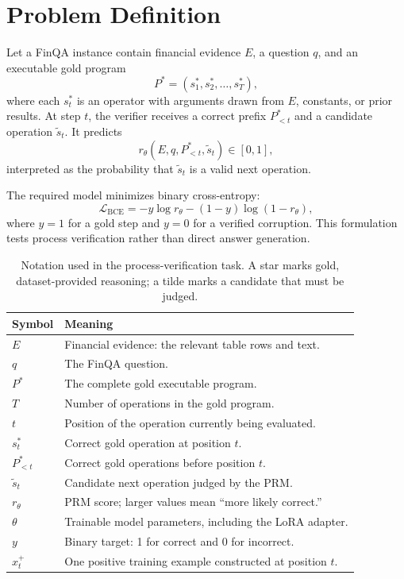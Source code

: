 \documentclass[10pt,twocolumn]{article}
\begin{document}
\section{Problem Definition}
Let a FinQA instance contain financial evidence $E$, a question $q$, and an executable gold program
\begin{equation}
  P^*=(s_1^*,s_2^*,\ldots,s_T^*),
\end{equation}
where each $s_t^*$ is an operator with arguments drawn from $E$, constants, or prior results. At step $t$, the verifier receives a correct prefix $P^*_{<t}$ and a candidate operation $\tilde{s}_t$. It predicts
\begin{equation}
  r_\theta(E,q,P^*_{<t},\tilde{s}_t)\in[0,1],
\end{equation}
interpreted as the probability that $\tilde{s}_t$ is a valid next operation.

The required model minimizes binary cross-entropy:
\begin{equation}
  \mathcal{L}_{\mathrm{BCE}}=-y\log r_\theta-(1-y)\log(1-r_\theta),
\end{equation}
where $y=1$ for a gold step and $y=0$ for a verified corruption. This formulation tests process verification rather than direct answer generation.

\begin{table}[t]
\centering
\caption{Notation used in the process-verification task. A star marks gold, dataset-provided reasoning; a tilde marks a candidate that must be judged.}
\label{tab:notation}
\small
\begin{tabularx}{\columnwidth}{>{\raggedright\arraybackslash}p{12mm} X}
\toprule
Symbol & Meaning \\
\midrule
$E$ & Financial evidence: the relevant table rows and text. \\
$q$ & The FinQA question. \\
$P^*$ & The complete gold executable program. \\
$T$ & Number of operations in the gold program. \\
$t$ & Position of the operation currently being evaluated. \\
$s_t^*$ & Correct gold operation at position $t$. \\
$P^*_{<t}$ & Correct gold operations before position $t$. \\
$\tilde{s}_t$ & Candidate next operation judged by the PRM. \\
$r_\theta$ & PRM score; larger values mean ``more likely correct.'' \\
$\theta$ & Trainable model parameters, including the LoRA adapter. \\
$y$ & Binary target: 1 for correct and 0 for incorrect. \\
$x_t^+$ & One positive training example constructed at position $t$. \\
\bottomrule
\end{tabularx}
\end{table}
\end{document}

